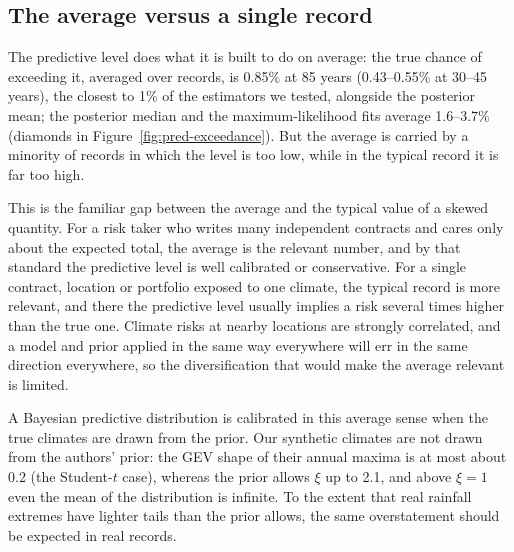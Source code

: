 \documentclass[11pt]{article}
\begin{document}
\begin{table}[H]
\centering\small\setlength{\tabcolsep}{3.5pt}
\caption{The posterior-predictive level at 85 years by kind of change (top) and by parent distribution (bottom, standard cases only). Records: number of records. Median: median true exceedance probability of the predictive level (ideal 1\%). Under and over: share of records (\%) in which the risk is understated (true exceedance above 2\%, level too low) or overstated (below 0.5\%, level too high) at least twofold; missed = under + over. Right: share missed by other estimators on the same records. Follows mean state: width and tail follow an accelerating mean; time-driven: the same end states reached linearly in time. The predictive level overstates more often than it understates in every kind of case.}\label{tab:pred-groups}

\end{table}

\subsection{The average versus a single record}\label{sec:pred-average}

The predictive level does what it is built to do on average: the true chance of exceeding it,
averaged over records, is 0.85\% at 85 years (0.43--0.55\% at 30--45 years), the closest to 1\% of
the estimators we tested, alongside the posterior mean; the posterior median and the
maximum-likelihood fits average 1.6--3.7\% (diamonds in Figure~\ref{fig:pred-exceedance}).
But the average is carried by a minority of records in which the level is too low, while in the
typical record it is far too high.

This is the familiar gap between the average and the typical value of a skewed quantity. For a
risk taker who writes many independent contracts and cares only about the expected total, the
average is the relevant number, and by that standard the predictive level is well calibrated or
conservative. For a single contract, location or portfolio exposed to one climate, the typical
record is more relevant, and there the predictive level usually implies a risk several times
higher than the true one. Climate risks at nearby locations are strongly correlated, and a model and
prior applied in the same way everywhere will err in the same direction everywhere, so the
diversification that would make the average relevant is limited.

A Bayesian predictive distribution is calibrated in this average sense when the true climates are
drawn from the prior. Our synthetic climates are not drawn from the authors' prior: the GEV shape
of their annual maxima is at most about 0.2 (the Student-$t$ case), whereas the prior allows $\xi$
up to 2.1, and above $\xi=1$ even the mean of the distribution is infinite. To the extent that real
rainfall extremes have lighter tails than the prior allows, the same overstatement should be
expected in real records.
\end{document}
